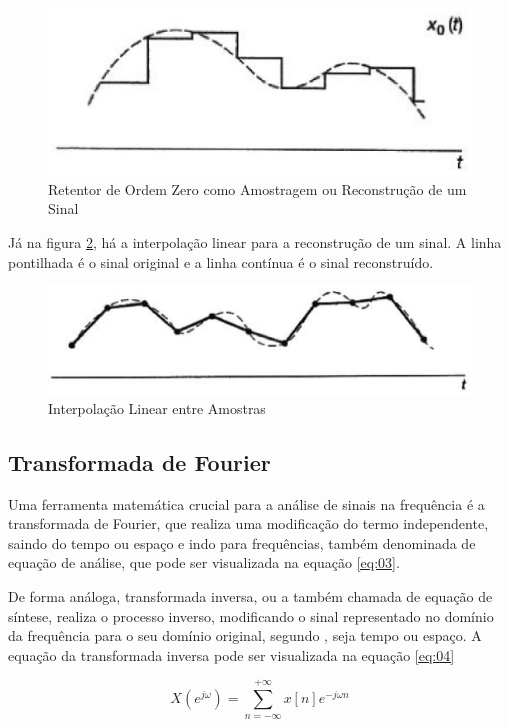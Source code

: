 \begin{figure}[h]
	\centering
    \includegraphics[scale=0.4]{figuras/fig05.eps}
	\caption{Retentor de Ordem Zero como Amostragem ou Reconstrução de um Sinal}
	\label{fig05}
\end{figure}

Já na figura \ref{fig06}, há a interpolação linear para a reconstrução de um sinal. A linha pontilhada é o sinal original e a linha contínua é o sinal reconstruído. 

\begin{figure}[h]
	\centering
    \includegraphics[scale=0.4]{figuras/fig06.eps}
	\caption{Interpolação Linear entre Amostras}
	\label{fig06}
\end{figure}

\subsection{Transformada de Fourier}
Uma ferramenta matemática crucial para a análise de sinais na frequência é a transformada de Fourier, que realiza uma modificação do termo independente, saindo do tempo ou espaço e indo para frequências, também denominada de equação de análise, que pode ser visualizada na equação \ref{eq:03}. \par De forma análoga, transformada inversa, ou a também chamada de equação de síntese, realiza o processo inverso, modificando o sinal representado no domínio da frequência para o seu domínio original, segundo \cite{oppenheim2010sinais}, seja tempo ou espaço. A equação da transformada inversa pode ser visualizada na equação \ref{eq:04}

\begin{equation}  \label{eq:03}
X(e^{j\omega})= \sum_{n=-\infty}^{+\infty} x[n]e^{-j\omega n}
\end{equation}

